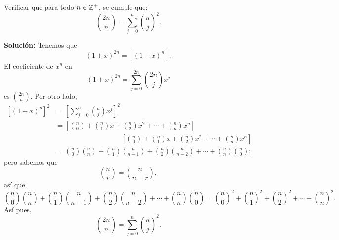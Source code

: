 \begin{myexample}
    Verificar que para todo $n \in \ZZ[+]$, se cumple que:
    $$\binom{2n}{n} = \sum_{j=0}^n \binom{n}{j}^2.$$

    \newpage\noindent
    \textbf{\color{jblueleft}Solución:} Tenemos que
    $$(1 + x)^{2n} = \left[ (1 + x)^n \right].$$
    El coeficiente de $x^n$ en
    $$(1 + x)^{2n} = \sum_{j=0}^{2n}\binom{2n}{j}x^j$$
    es $\displaystyle \binom{2n}{n}$. Por otro lado,
    \begin{align*}
        \left[ (1+x)^n \right]^2 & = \left[ \sum_{j=0}^{n}\binom{n}{j}x^j \right]^2 \\
        & = \left[ \binom{n}{0} + \binom{n}{1}x + \binom{n}{2}x^2 + \cdots + \binom{n}{n}x^n \right] \\
        & \hspace{4cm} \left[ \binom{n}{0} + \binom{n}{1}x + \binom{n}{2}x^2 + \cdots + \binom{n}{n}x^n \right] \\
        & = \binom{n}{0} \binom{n}{n} + \binom{n}{1} \binom{n}{n-1} + \binom{n}{2} \binom{n}{n-2} + \cdots + \binom{n}{n} \binom{n}{0};
    \end{align*}
    pero sabemos que
    $$\binom{n}{r} = \binom{n}{n-r},$$
    así que
    $$\binom{n}{0} \binom{n}{n} + \binom{n}{1} \binom{n}{n-1} + \binom{n}{2} \binom{n}{n-2} + \cdots + \binom{n}{n} \binom{n}{0} = \binom{n}{0}^2 + \binom{n}{1}^2 + \binom{n}{2}^2 + \cdots + \binom{n}{n}^2.$$
    Así pues,
    $$\binom{2n}{n} = \sum_{j=0}^{n} \binom{n}{j}^2.$$
\end{myexample}

